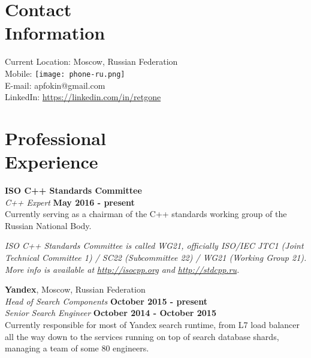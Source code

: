\documentclass[margin,line]{CV}
\def\superofficial{}
\begin{document}
\begin{resume}


    \section{\mysidestyle Contact\\Information}
    Current Location: Moscow, Russian Federation \\
    Mobile: \texttt{[image: phone-ru.png]} \\ 
    E-mail: apfokin@gmail.com \\
    LinkedIn: \url{https://linkedin.com/in/retgone}

    \section{\mysidestyle Professional\\Experience}
    \textbf{ISO C++ Standards Committee} \vspace{2mm}\\\vspace{1mm}%
    \textsl{C++ Expert} \hfill \textbf{May 2016 - present}\\\vspace{1mm}%
    Currently serving as a chairman of the C++ standards working group of the Russian National Body.

\ifdefined\superofficial
    {\footnotesize\textit{ISO C++ Standards Committee is called WG21, officially ISO/IEC JTC1 (Joint Technical Committee 1) / SC22 (Subcommittee 22) / WG21 (Working Group 21). More info is available at \url{http://isocpp.org} and \url{http://stdcpp.ru}.}}
\fi
    
    \textbf{Yandex}, Moscow, Russian Federation \vspace{2mm}\\\vspace{1mm}%
    \textsl{Head of Search Components} \hfill \textbf{October 2015 - present}\\\vspace{1mm}%
    \textsl{Senior Search Engineer} \hfill \textbf{October 2014 - October 2015}\\
    Currently responsible for most of Yandex search runtime, from L7 load balancer all the way down to the services running on top of search database shards, managing a team of some 80 engineers.
    

\end{resume}
\end{document}
